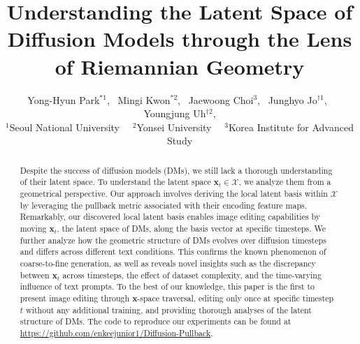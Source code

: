 \documentclass{article}
\title{
    Understanding the Latent Space of Diffusion Models through the Lens of Riemannian Geometry
}
\author{
Yong-Hyun Park$^{*1}$,~
Mingi Kwon$^{*2}$,~
Jaewoong Choi$^{3}$,~
Junghyo Jo$^{\dagger1}$,~
Youngjung Uh$^{\dagger2}$,
\vspace{+0.3em}
\\
\normalsize$^1$Seoul National University~~
$^2$Yonsei University~~
$^3$Korea Institute for Advanced Study\\
}
\theoremstyle{plain}
\theoremstyle{definition}
\theoremstyle{remark}
\begin{document}
\maketitle


\begin{abstract}
Despite the success of diffusion models (DMs), we still lack a thorough understanding of their latent space. To understand the latent space $\mathbf{x}_t \in \mathcal{X}$, we analyze them from a geometrical perspective. Our approach involves deriving the local latent basis within $\mathcal{X}$ by leveraging the pullback metric associated with their encoding feature maps. Remarkably, our discovered local latent basis enables image editing capabilities by moving $\mathbf{x}_t$, the latent space of DMs, along the basis vector at specific timesteps. We further analyze how the geometric structure of DMs evolves over diffusion timesteps and differs across different text conditions. This confirms the known phenomenon of coarse-to-fine generation, as well as reveals novel insights such as the discrepancy between $\mathbf{x}_t$ across timesteps, the effect of dataset complexity, and the time-varying influence of text prompts. To the best of our knowledge, this paper is the first to present image editing through $\mathbf{x}$-space traversal, editing only once at specific timestep $t$ without any additional training, and providing thorough analyses of the latent structure of DMs.
The code to reproduce our experiments can be found at {\color{cyan}\url{https://github.com/enkeejunior1/Diffusion-Pullback}}.
\end{abstract}













\end{document}
